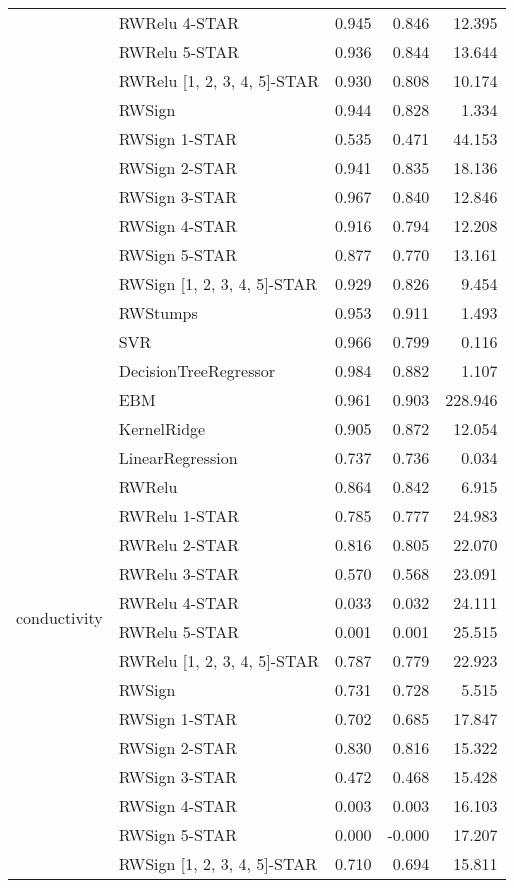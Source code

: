 \begin{tabular}{llrrr}
 & RWRelu 4-STAR & 0.945 & 0.846 & 12.395 \\
 & RWRelu 5-STAR & 0.936 & 0.844 & 13.644 \\
 & RWRelu [1, 2, 3, 4, 5]-STAR & 0.930 & 0.808 & 10.174 \\
 & RWSign & 0.944 & 0.828 & 1.334 \\
 & RWSign 1-STAR & 0.535 & 0.471 & 44.153 \\
 & RWSign 2-STAR & 0.941 & 0.835 & 18.136 \\
 & RWSign 3-STAR & 0.967 & 0.840 & 12.846 \\
 & RWSign 4-STAR & 0.916 & 0.794 & 12.208 \\
 & RWSign 5-STAR & 0.877 & 0.770 & 13.161 \\
 & RWSign [1, 2, 3, 4, 5]-STAR & 0.929 & 0.826 & 9.454 \\
 & RWStumps & 0.953 & 0.911 & 1.493 \\
 & SVR & 0.966 & 0.799 & 0.116 \\
\cline{1-5}
\multirow[t]{20}{*}{conductivity} & DecisionTreeRegressor & 0.984 & 0.882 & 1.107 \\
 & EBM & 0.961 & 0.903 & 228.946 \\
 & KernelRidge & 0.905 & 0.872 & 12.054 \\
 & LinearRegression & 0.737 & 0.736 & 0.034 \\
 & RWRelu & 0.864 & 0.842 & 6.915 \\
 & RWRelu 1-STAR & 0.785 & 0.777 & 24.983 \\
 & RWRelu 2-STAR & 0.816 & 0.805 & 22.070 \\
 & RWRelu 3-STAR & 0.570 & 0.568 & 23.091 \\
 & RWRelu 4-STAR & 0.033 & 0.032 & 24.111 \\
 & RWRelu 5-STAR & 0.001 & 0.001 & 25.515 \\
 & RWRelu [1, 2, 3, 4, 5]-STAR & 0.787 & 0.779 & 22.923 \\
 & RWSign & 0.731 & 0.728 & 5.515 \\
 & RWSign 1-STAR & 0.702 & 0.685 & 17.847 \\
 & RWSign 2-STAR & 0.830 & 0.816 & 15.322 \\
 & RWSign 3-STAR & 0.472 & 0.468 & 15.428 \\
 & RWSign 4-STAR & 0.003 & 0.003 & 16.103 \\
 & RWSign 5-STAR & 0.000 & -0.000 & 17.207 \\
 & RWSign [1, 2, 3, 4, 5]-STAR & 0.710 & 0.694 & 15.811 \\

\end{tabular}
